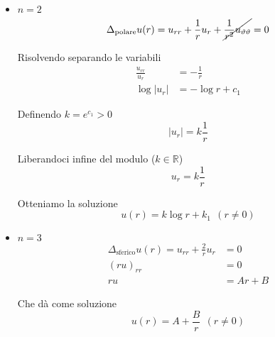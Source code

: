 \documentclass[10pt,a4paper,twoside,openright]{book}
\begin{document}
\begin{itemize}
    \item $n=2$
          \begin{equation*}
              \Delta _{\text{polare}} u(r) =u_{rr} +\frac{1}{r} u_{r} +\cancel{\frac{1}{r^{2}} u_{\vartheta \vartheta }} =0
          \end{equation*}

          Risolvendo separando le variabili
          \begin{align*}
              \frac{u_{rr}}{u_{r}} & =-\frac{1}{r}  \\
              \log| u_{r}|         & =-\log r+c_{1}
          \end{align*}

          Definendo $\displaystyle k=e^{c_{1}}  >0$
          \begin{equation*}
              | u_{r}| =k\frac{1}{r}
          \end{equation*}

          Liberandoci infine del modulo ($\displaystyle k\in \mathbb{R}$)
          \begin{equation*}
              u_{r} =k\frac{1}{r}
          \end{equation*}

          Otteniamo la soluzione
          \begin{equation*}
              \boxed{u(r) =k\log r+k_{1}} \ \ (r\neq 0)
          \end{equation*}
    \item $n=3$
          \begin{align*}
              \Delta _{\text{sferico}} u(r) =u_{rr} +\frac{2}{r} u_{r} & =0    \\
              (ru)_{rr}                                                & =0    \\
              ru                                                       & =Ar+B
          \end{align*}

          Che dà come soluzione
          \begin{equation*}
              \boxed{u(r) =A+\frac{B}{r}} \ \ (r\neq 0)
          \end{equation*}
\end{itemize}
\end{document}
